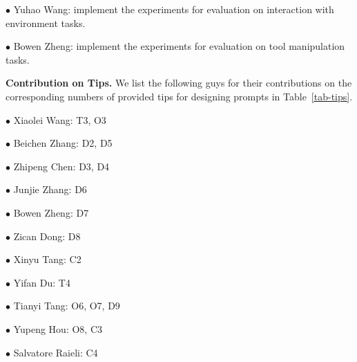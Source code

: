 \documentclass[10pt,journal,compsoc,x11names]{IEEEtran}
\newcommand{\paratitle}[1]{\vspace{1.5ex}\noindent\textbf{#1}}
\begin{document}
$\bullet$ Yuhao Wang: implement the experiments for evaluation on interaction with environment tasks.

$\bullet$ Bowen Zheng: implement the experiments for evaluation on tool manipulation tasks.

\paratitle{Contribution on Tips.}
We list the following guys for their contributions on the corresponding numbers of provided tips for designing prompts in Table~\ref{tab-tips}.

$\bullet$ Xiaolei Wang: T3, O3

$\bullet$ Beichen Zhang: D2, D5

$\bullet$ Zhipeng Chen: D3, D4

$\bullet$ Junjie Zhang: D6

$\bullet$ Bowen Zheng: D7

$\bullet$ Zican Dong: D8

$\bullet$ Xinyu Tang: C2

$\bullet$ Yifan Du: T4

$\bullet$ Tianyi Tang: O6, O7, D9

$\bullet$ Yupeng Hou: O8, C3

$\bullet$ Salvatore Raieli: C4


\ifCLASSOPTIONcaptionsoff
  \newpage
\fi







\end{document}
